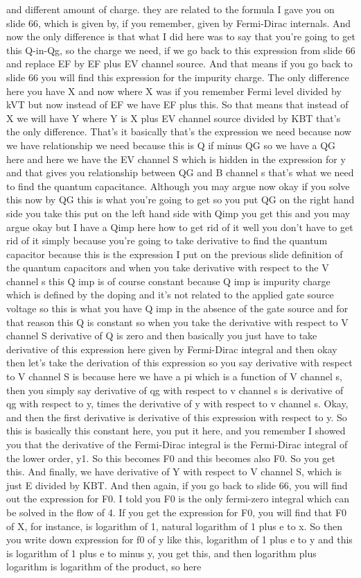 and different amount of charge. they are related to the formula I gave you on slide 66, which is given by, if you remember, given by Fermi-Dirac internals. And now the only difference is that what I did here was to say that you're going to get this Q-in-Qg, so the charge we need, if we go back to this expression from slide 66 and replace EF by EF plus EV channel source. And that means if you go back to slide 66 you will find this expression for the impurity charge. The only difference here you have X and now where X was if you remember Fermi level divided by kVT but now instead of EF we have EF plus this. So that means that instead of X we will have Y where Y is X plus EV channel source divided by KBT that's the only difference. That's it basically that's the expression we need because now we have relationship we need because this is Q if minus QG so we have a QG here and here we have the EV channel S which is hidden in the expression for y and that gives you relationship between QG and B channel s that's what we need to find the quantum capacitance. Although you may argue now okay if you solve this now by QG this is what you're going to get so you put QG on the right hand side you take this put on the left hand side with Qimp you get this and you may argue okay but I have a Qimp here how to get rid of it well you don't have to get rid of it simply because you're going to take derivative to find the quantum capacitor because this is the expression I put on the previous slide definition of the quantum capacitors and when you take derivative with respect to the V channel s this Q imp is of course constant because Q imp is impurity charge which is defined by the doping and it's not related to the applied gate source voltage so this is what you have Q imp in the absence of the gate source and for that reason this Q is constant so when you take the derivative with respect to V channel S derivative of Q is zero and then basically you just have to take derivative of this expression here given by Fermi-Dirac integral and then okay then let's take the derivation of this expression so you say derivative with respect to V channel S is because here we have a pi which is a function of V channel s, then you simply say derivative of qg with respect to v channel s is derivative of qg with respect to y, times the derivative of y with respect to v channel s. Okay, and then the first derivative is derivative of this expression with respect to y. So this is basically this constant here, you put it here, and you remember I showed you that the derivative of the Fermi-Dirac integral is the Fermi-Dirac integral of the lower order, y1. So this becomes F0 and this becomes also F0. So you get this. And finally, we have derivative of Y with respect to V channel S, which is just E divided by KBT. And then again, if you go back to slide 66, you will find out the expression for F0. I told you F0 is the only fermi-zero integral which can be solved in the flow of 4. If you get the expression for F0, you will find that F0 of X, for instance, is logarithm of 1, natural logarithm of 1 plus e to x. So then you write down expression for f0 of y like this, logarithm of 1 plus e to y and this is logarithm of 1 plus e to minus y, you get this, and then logarithm plus logarithm is logarithm of the product, so here 